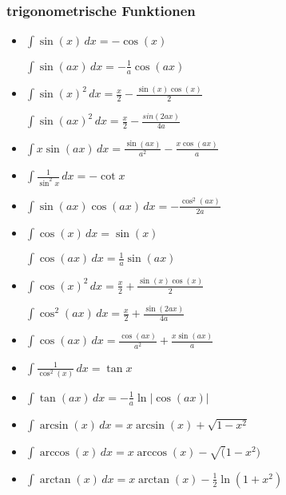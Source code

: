 \subsubsection{trigonometrische Funktionen}
\begin{itemize}[leftmargin=*]
	\item
	\begin{minipage}{0.5\columnwidth}
		$\int \sin(x) \, dx = - \cos(x)$
	\end{minipage}
	\begin{minipage}{0.45\columnwidth}
		$\int \sin(ax) \,dx = -\frac{1}{a}\cos(ax)$
	\end{minipage}

	\item
	\begin{minipage}{0.5\columnwidth}
		 $\int \sin(x)^2 \, dx = \frac{x}{2} - \frac{\sin(x) \cos(x)}{2}$
	\end{minipage}
	\begin{minipage}{0.45\columnwidth}
		$\int \sin(ax)^2 \,dx = \frac{x}{2} - \frac{sin(2ax)}{4a}$
	\end{minipage}
		  
	\item $\int x \sin(ax) \,dx = \frac{\sin(ax)}{a^2} - \frac{x \cos(ax)}{a}$
	\item $\int \frac{1}{\sin^2 x} \,dx = -\cot x$
   	\item $\int \sin(ax) \cos(ax) \,dx = -\frac{\cos^2(ax)}{2a}$

   	\item 
	\begin{minipage}{0.5\columnwidth}
		$\int \cos(x) \, dx = \sin(x)$
	\end{minipage}
	\begin{minipage}{0.45\columnwidth}
		$\int \cos(ax) \,dx = \frac{1}{a}\sin(ax)$
	\end{minipage}

	\item
	\begin{minipage}{0.5\columnwidth}
		$\int \cos(x)^2 \, dx = \frac{x}{2} + \frac{\sin(x) \cos(x)}{2}$
	\end{minipage}
	\begin{minipage}{0.45\columnwidth}
		$\int \cos^2(ax) \,dx = \frac{x}{2} + \frac{\sin(2ax)}{4a}$
	\end{minipage}
		  
	\item $\int \cos(ax) \,dx = \frac{\cos(ax)}{a^2} + \frac{x \sin(ax)}{a}$
	\item $\int \frac{1}{\cos^2(x)} \,dx = \tan x$
	
	\item $\int \tan(ax) \,dx = - \frac{1}{a} \ln | \cos(ax) |$
	\item $\int \arcsin(x) \,dx = x \arcsin(x) + \sqrt{1 - x^2}$
	\item $\int \arccos(x) \,dx = x \arccos(x) - \sqrt(1-x^2)$
	\item $\int \arctan(x) \,dx = x \arctan(x) - \frac{1}{2} \ln(1+x^2)$
\end{itemize}

